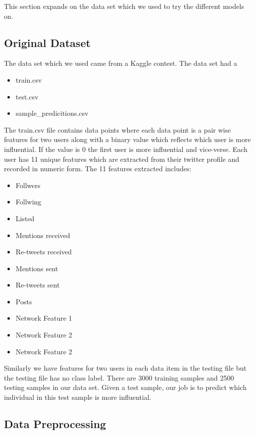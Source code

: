 \documentclass[conference]{IEEEtran}
\numberwithin{equation}{section}
\numberwithin{figure}{section}
\numberwithin{table}{section}
\begin{document}
This section expands on the data set which we used to try the different models on. 


\subsection{Original Dataset}\label{sec:formatting}
The data set which we used came from a Kaggle contest. The data set had a 
\begin{itemize}
  \item train.csv
  \item test.csv
  \item sample\_predicitions.csv
\end{itemize}

The train.csv file contains data points where each data point is a pair wise features for two users along with a binary value which reflects which user is more influential. If the value is 0 the first user is more influential and vice-verse. Each user has 11 unique features which are extracted from their twitter profile and recorded in numeric form. The 11 features extracted includes:

\begin{itemize}
  \item Follwers
  \item Follwing
  \item Listed
  \item Mentions received
  \item Re-tweets received
  \item Mentions sent
  \item Re-tweets sent
  \item Posts
  \item Network Feature 1
  \item Network Feature 2
  \item Network Feature 2
\end{itemize}

Similarly we have features for two users in each data item in the testing file but the testing file has no class label. There are 3000 training samples and 2500 testing samples in our data set. Given a test sample, our job is to predict which individual in this test sample is more influential.
 




\subsection{Data Preprocessing
}\label{sec:formatting-text}
\end{document}
